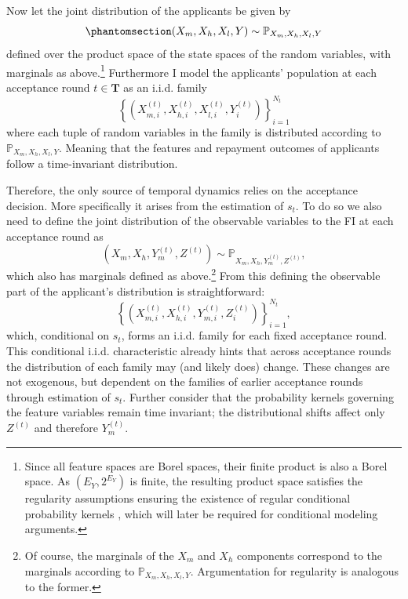\documentclass[
  12pt,
]{article}
\begin{document}
Now let the joint distribution of the applicants be given by
\begin{equation}\protect\phantomsection\label{eq-joint-dist-feats-and-repayment}{
(X_m, X_h, X_l, Y) \sim \mathbb{P}_{X_m, X_h, X_l, Y}
}\end{equation} defined over the product space of the state spaces of
the random variables, with marginals as above.\footnote{ Since all
  feature spaces are Borel spaces, their finite product is also a Borel
  space. As \(\left(E_Y, 2^{E_Y}\right)\) is finite, the resulting
  product space satisfies the regularity assumptions ensuring the
  existence of regular conditional probability kernels \autocite[Ch. 4,
  Theorem 9]{Pollard_2001}, which will later be required for conditional
  modeling arguments.} Furthermore I model the applicants' population at
each acceptance round \(t \in \mathbf{T}\) as an i.i.d. family \[
\left\{ \left(X_{m,i}^{(t)}, X_{h,i}^{(t)}, X_{l,i}^{(t)}, Y_{i}^{(t)} \right)\right\}_{i=1}^{N_t}
\] where each tuple of random variables in the family is distributed
according to \(\mathbb{P}_{X_m, X_h, X_l, Y}\). Meaning that the
features and repayment outcomes of applicants follow a time-invariant
distribution.

Therefore, the only source of temporal dynamics relies on the acceptance
decision. More specifically it arises from the estimation of \(s_t\). To
do so we also need to define the joint distribution of the observable
variables to the FI at each acceptance round as \[
\left(X_m, X_h, Y_m^{(t)} , Z^{(t)}\right) \sim \mathbb{P}_{X_m, X_h, Y_m^{(t)} , Z^{(t)}},
\] which also has marginals defined as above.\footnote{ Of course, the
  marginals of the \(X_m\) and \(X_h\) components correspond to the
  marginals according to \(\mathbb{P}_{X_m, X_h, X_l, Y}\).
  Argumentation for regularity is analogous to the former.} From this
defining the observable part of the applicant's distribution is
straightforward: \[
\left\{\left(X_{m,i}^{(t)}, X_{h,i}^{(t)}, Y_{m, i}^{(t)}, Z^{(t)}_i \right)\right\}_{i=1}^{N_t},
\] which, conditional on \(s_t\), forms an i.i.d. family for each fixed
acceptance round. This conditional i.i.d. characteristic already hints
that across acceptance rounds the distribution of each family may (and
likely does) change. These changes are not exogenous, but dependent on
the families of earlier acceptance rounds through estimation of \(s_t\).
Further consider that the probability kernels governing the feature
variables remain time invariant; the distributional shifts affect only
\(Z^{(t)}\) and therefore \(Y_{m}^{(t)}\).
\end{document}
